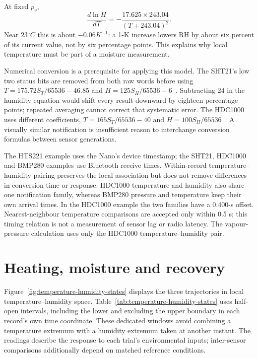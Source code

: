 At fixed $p_v$,
\begin{equation}
 \frac{d\ln H}{dT}=-\frac{17.625\times243.04}{(T+243.04)^2}.
 \label{eq:temperature-humidity-thermal-slope}
\end{equation}
Near $23\unit{^\circ C}$ this is about $-0.06\unit{K^{-1}}$: a 1-K increase lowers RH by about six percent of its current value, not by six percentage points. This explains why local temperature must be part of a moisture measurement.

Numerical conversion is a prerequisite for applying this model. The SHT21's low two status bits are removed from both raw words before using $T=175.72S_T/65536-46.85$ and $H=125S_H/65536-6$~\cite{sht21}. Subtracting 24 in the humidity equation would shift every result downward by eighteen percentage points; repeated averaging cannot correct that systematic error. The HDC1000 uses different coefficients, $T=165S_T/65536-40$ and $H=100S_H/65536$~\cite{hdc1000}. A visually similar notification is insufficient reason to interchange conversion formulas between sensor generations.

The HTS221 example uses the Nano's device timestamp; the SHT21, HDC1000 and BMP280 examples use Bluetooth receive times. Within-record temperature--humidity pairing preserves the local association but does not remove differences in conversion time or response. HDC1000 temperature and humidity also share one notification family, whereas BMP280 pressure and temperature keep their own arrival times. In the HDC1000 example the two families have a 0.400-s offset. Nearest-neighbour temperature comparisons are accepted only within 0.5 s; this timing relation is not a measurement of sensor lag or radio latency. The vapour-pressure calculation uses only the HDC1000 temperature--humidity pair.

\section{Heating, moisture and recovery}
Figure~\ref{fig:temperature-humidity-states} displays the three trajectories in local temperature--humidity space. Table~\ref{tab:temperature-humidity-states} uses half-open intervals, including the lower and excluding the upper boundary in each record's own time coordinate. These dedicated windows avoid combining a temperature extremum with a humidity extremum taken at another instant. The readings describe the response to each trial's environmental inputs; inter-sensor comparisons additionally depend on matched reference conditions.

